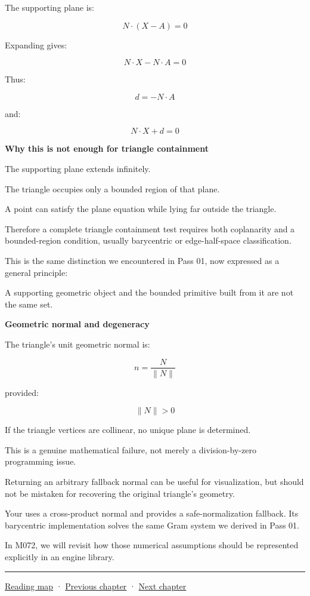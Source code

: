 The supporting plane is:

\[
\boxed{ N\cdot(X-A)=0 }
\]

Expanding gives:

\[
\boxed{ N\cdot X-N\cdot A=0 }
\]

Thus:

\[
d=-N\cdot A
\]

and:

\[
\boxed{ N\cdot X+d=0 }
\]

\textbf{Why this is not enough for triangle containment}

The supporting plane extends infinitely.

The triangle occupies only a bounded region of that plane.

A point can satisfy the plane equation while lying far outside the triangle.

Therefore a complete triangle containment test requires both coplanarity and a bounded-region condition, usually barycentric or edge-half-space classification.

This is the same distinction we encountered in Pass 01, now expressed as a general principle:

A supporting geometric object and the bounded primitive built from it are not the same set.

\textbf{Geometric normal and degeneracy}

The triangle's unit geometric normal is:

\[
n=\frac{N}{\|N\|}
\]

provided:

\[
\|N\|>0
\]

If the triangle vertices are collinear, no unique plane is determined.

This is a genuine mathematical failure, not merely a division-by-zero programming issue.

Returning an arbitrary fallback normal can be useful for visualization, but should not be mistaken for recovering the original triangle's geometry.

Your  uses a cross-product normal and provides a safe-normalization fallback. Its barycentric implementation solves the same Gram system we derived in Pass 01.

In M072, we will revisit how those numerical assumptions should be represented explicitly in an engine library.

\begin{center}\rule{0.5\linewidth}{0.5pt}\end{center}

\hyperref[volume-reading-map]{Reading map} · \hyperref[03-visual-computing-i-ch021-collision-implementations-and-repository-comparison]{Previous chapter} · \hyperref[04-visual-computing-ii-ch023-mesh-topology-and-connectivity]{Next chapter}
